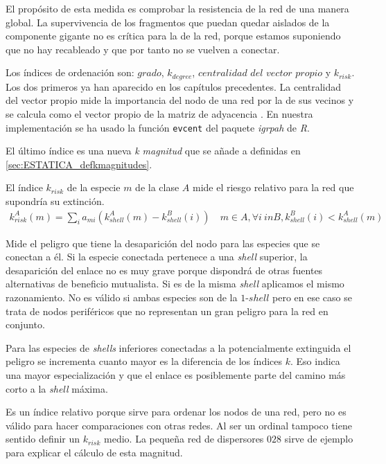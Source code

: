 El propósito de esta medida es comprobar la resistencia de la red de una manera global. La supervivencia de los fragmentos que puedan quedar aislados de la componente gigante no es crítica para la de la red, porque estamos suponiendo que no hay recableado y que por tanto no se vuelven a conectar.

Los índices de ordenación son: $grado$, ${k}_{degree}$, $centralidad$ $del$ $vector$ $propio$ y ${k}_{risk}$. Los dos primeros ya han aparecido en los capítulos precedentes. La centralidad del vector propio mide la importancia del nodo de una red por la de sus vecinos y se calcula como el vector propio de la matriz de adyacencia \cite{newman2008mathematics}. En nuestra implementación se ha usado la función \texttt{evcent} del paquete \textit{igrpah} de \textit{R}.

El último índice es una nueva \textit{k magnitud} que se añade a definidas en \ref{sec:ESTATICA_defkmagnitudes}. 

\begin{theo} 
El índice \textit{$k_{risk}$} de la especie $m$ de la clase $A$ mide el riesgo relativo para la red que supondría su extinción.
\begin{align*}
k^A_{risk}\left(m\right) = \sum\limits_{i} a_{mi} \left(k^A_{shell}\left(m\right) - k^B_{shell}\left(i\right)\right)\quad   m \in A, \forall i\: in B, k^B_{shell}\left(i\right) < k^A_{shell}\left(m\right)
\end{align*}
\label{krisk}
\end{theo}

Mide el peligro que tiene la desaparición del nodo para las especies que se conectan a él. Si la especie conectada pertenece a una \textit{shell} superior, la desaparición del enlace no es muy grave porque dispondrá de otras fuentes alternativas de beneficio mutualista. Si es de la misma \textit{shell} aplicamos el mismo razonamiento. No es válido si ambas especies son de la $1$-$shell$ pero en ese caso se trata de nodos periféricos que no representan un gran peligro para la red en conjunto.

Para las especies de \textit{shells} inferiores conectadas a la potencialmente extinguida el peligro se incrementa cuanto mayor es la diferencia de los índices $k$. Eso indica una mayor especialización y que el enlace es posiblemente parte del camino más corto a la \textit{shell} máxima.

Es un índice relativo porque sirve para ordenar los nodos de una red, pero no es válido para hacer comparaciones con otras redes. Al ser un ordinal tampoco tiene sentido definir un $k_{risk}$ medio. La pequeña red de dispersores $028$ sirve de ejemplo para explicar el cálculo de esta magnitud.

